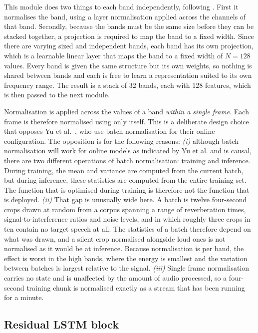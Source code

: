 This module does two things to each band independently, following \cite{yu2023high}. First it normalises the band, using a layer normalisation applied across the channels of that band. Secondly, because the bands must be the same size before they can be stacked together, a projection is required to map the band to a fixed width. Since there are varying sized and independent bands, each band has its own projection, which is a learnable linear layer that maps the band to a fixed width of $N = 128$ values. Every band is given the same structure but its own weights, so nothing is shared between bands and each is free to learn a representation suited to its own frequency range. The result is a stack of 32 bands, each with 128 features, which is then passed to the next module.

Normalisation is applied across the values of a band \emph{within a single frame}. Each frame is therefore normalised using only itself. This is a deliberate design choice that opposes Yu et al.\ \cite{yu2023high}, who use batch
normalisation for their online configuration. The opposition is for the following reasons: \textit{(i)} although batch normalisation will work for online models as indicated by Yu et al. and is causal, there are two different operations of batch normalisation: training and inference. During training, the mean and variance are computed from the current batch, but during inference, these statistics are computed from the entire training set. The function that is optimised during training is therefore not the function that is deployed. \textit{(ii)} That gap is unusually wide here. A batch is twelve four-second crops drawn at random from a corpus spanning a range of reverberation times, signal-to-interference ratios and noise levels, and in which roughly three crops in ten contain no target speech at all. The statistics of a batch therefore depend on what was drawn, and a silent crop normalised alongside loud ones is not normalised as it would be at inference. Because normalisation is per band, the effect is worst in the high bands, where the energy is smallest and the variation between batches is largest relative to the signal. \textit{(iii)} Single frame normalisation carries no state and is unaffected by the amount of audio processed, so a four-second training chunk is normalised exactly as a stream that has been running for a minute.


\subsection{Residual LSTM block}
\label{sec:resrnn}

